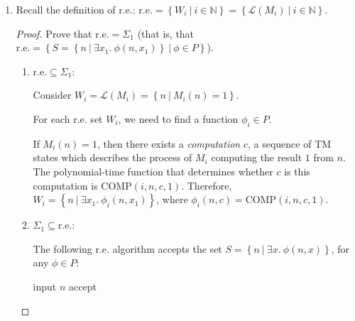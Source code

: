 \documentclass[12pt]{article}
\begin{document}
\noindent{}
\addtocounter{section}{1}

\newcommand{\re}{\text{r.e.}}
\newcommand{\cre}{\text{co-r.e.}}
\newcommand{\nat}{\mathbb{N}}
\newcommand{\lang}{\mathcal{L}}
\newcommand{\setb}[2]{\left\{ #1 ~|~ #2 \right\}}

\begin{enumerate}

  \item Recall the definition of r.e.:
    $\re = \setb{W_i}{i \in \nat} = \setb{\lang(M_i)}{i \in \nat}$.

    \begin{proof}
      Prove that $\re = \Sigma_1$ (that is, that
      $\re = \setb{S = \setb{n}{\exists x_1.~\phi(n, x_1)}}{\phi \in P}$).
      
      \begin{enumerate}
        \item $\re \subseteq \Sigma_1$:

          Consider $W_i = \lang(M_i) = \setb{n}{M_i(n)=1}$.

          For each r.e. set $W_i$, we need to find a function $\phi_i \in P$.

          If $M_i(n) = 1$, then there exists a \emph{computation} $c$, a
          sequence of TM states which describes the process of $M_i$ computing
          the result $1$ from $n$. The polynomial-time function that
          determines whether $c$ is this computation is $\text{COMP}(i,n,c,1)$.
          Therefore, $W_i = \setb{n}{\exists x_1.~\phi_i(n, x_1)}$, where
          $\phi_i(n, c) = \text{COMP}(i, n, c, 1)$.

        \item $\Sigma_1 \subseteq \re$:

          The following r.e. algorithm accepts the set
          $S = \setb{n}{\exists x.~\phi(n, x)}$, for any $\phi \in P$:

          \begin{algorithmic}
            \STATE input $n$
                \STATE accept
              \ENDIF
            \ENDFOR
          \end{algorithmic}

      \end{enumerate}
    \end{proof}


\end{enumerate}
\end{document}
